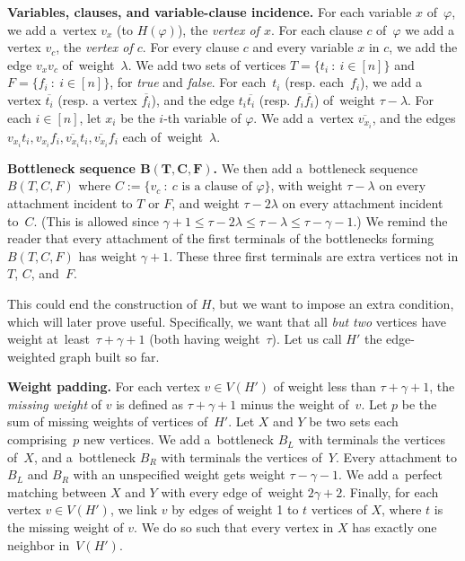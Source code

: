 \documentclass[a4paper,UKenglish,cleveref,hyperref,autoref]{lipics-v2021}
\begin{document}
\medskip

\textbf{Variables, clauses, and variable-clause incidence.}
For each variable $x$ of~$\varphi$, we add a~vertex $v_x$ (to $H(\varphi)$), the \emph{vertex of $x$}.
For each clause $c$ of~$\varphi$ we add a vertex $v_c$, the \emph{vertex of $c$}.
For every clause $c$ and every variable $x$ in $c$, we add the edge $v_xv_c$ of~weight~$\lambda$.
We add two sets of vertices $T = \{t_i \ : \ i \in [n]\}$ and $F = \{f_i \ : \ i \in [n]\}$, for \emph{true} and \emph{false}.
For each~$t_i$ (resp. each~$f_i$), we add a vertex $\overline{t_i}$ (resp. a vertex $\overline{f_i}$), and the edge $t_i \overline{t_i}$ (resp. $f_i \overline{f_i}$) of~weight $\tau - \lambda$.
For each $i \in [n]$, let $x_i$ be the $i$-th variable of $\varphi$.
We add a~vertex $\overline{v_{x_i}}$, and the edges $v_{x_i}t_i, v_{x_i}f_i, \overline{v_{x_i}}t_i, \overline{v_{x_i}}f_i$ each of~weight~$\lambda$.

\medskip

\textbf{Bottleneck sequence $\bm{B(T,C,F)}$.}
We then add a~bottleneck sequence $B(T,C,F)$ where $C := \{v_c \ : \ c\text{ is a clause of } \varphi \}$, with weight $\tau - \lambda$ on every attachment incident to $T$ or $F$, and weight $\tau - 2\lambda$ on every attachment incident to~$C$.
(This is allowed since $\gamma + 1 \leqslant \tau - 2\lambda \leqslant \tau - \lambda \leqslant \tau - \gamma - 1$.)
We remind the reader that every attachment of the first terminals of the bottlenecks forming $B(T,C,F)$ has weight $\gamma+1$.
These three first terminals are extra vertices not in $T$, $C$, and~$F$.

\medskip

This could end the construction of $H$, but we want to impose an extra condition, which will later prove useful.
Specifically, we want that all \emph{but two} vertices have weight at~least~$\tau + \gamma + 1$ (both having weight~$\tau$).
Let us call $H'$ the edge-weighted graph built so far. 

\medskip

\textbf{Weight padding.}
For each vertex $v \in V(H')$ of weight less than $\tau + \gamma + 1$, the \emph{missing weight} of $v$ is defined as $\tau + \gamma + 1$ minus the weight of~$v$.
Let $p$ be the sum of missing weights of vertices of~$H'$.
Let $X$ and $Y$ be two sets each comprising~$p$ new vertices.
We add a~bottleneck $B_L$ with terminals the vertices of~$X$, and a~bottleneck $B_R$ with terminals the vertices of~$Y$.
Every attachment to $B_L$ and $B_R$ with an unspecified weight gets weight $\tau - \gamma - 1$.
We add a~perfect matching between $X$ and $Y$ with every edge of~weight $2 \gamma + 2$.
Finally, for each vertex $v \in V(H')$, we link $v$ by edges of weight 1 to $t$ vertices of $X$, where $t$ is the missing weight of $v$.
We do so such that every vertex in $X$ has exactly one neighbor in~$V(H')$.
\end{document}
